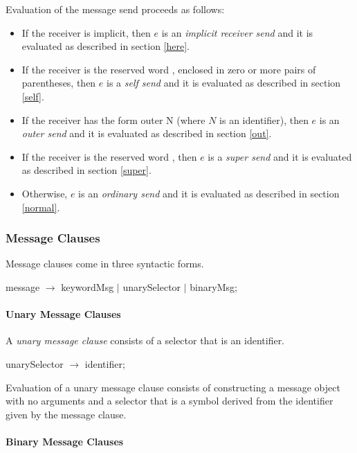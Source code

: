 \documentclass{article}
\newcommand{\code}[1]{{\sf #1}}
\begin{document}
Evaluation of the message send proceeds as follows:
\begin{itemize}
\item
If the receiver is implicit, then $e$ is an {\em implicit receiver send} and it is evaluated as described in section \ref{here}.
\item 
If the receiver is the reserved word \SELF{}, enclosed in zero or more pairs of parentheses, then $e$ is a {\em self send} and it is evaluated as described in section \ref{self}.
\item
If the receiver has the form \code{outer N} (where $N$ is an identifier),  then $e$ is an {\em outer send} and it is evaluated as described in section \ref{out}.
\item
If the receiver is the reserved word \SUPER, then $e$ is a {\em super send} and it is evaluated as described in section \ref{super}.
\item Otherwise, $e$ is an {\em ordinary send} and it is evaluated as described in section \ref{normal}.
\end{itemize}

\subsubsection{Message Clauses}
\label{msgClause}

Message clauses come in three syntactic forms. 

\begin{newspeak}
message $\rightarrow$ keywordMsg $|$ unarySelector $|$ binaryMsg;
\end{newspeak}

\paragraph{Unary Message Clauses}
\label{unaryMsg}

A {\em unary message clause} consists of a selector that is an identifier.
\begin{newspeak}
unarySelector $\rightarrow$ identifier;
\end{newspeak}
Evaluation of a unary message clause consists of constructing a message object with no arguments and a selector that is a symbol derived from the identifier given by the message clause.

\paragraph{Binary Message Clauses}
\label{binaryMsg}
\end{document}
